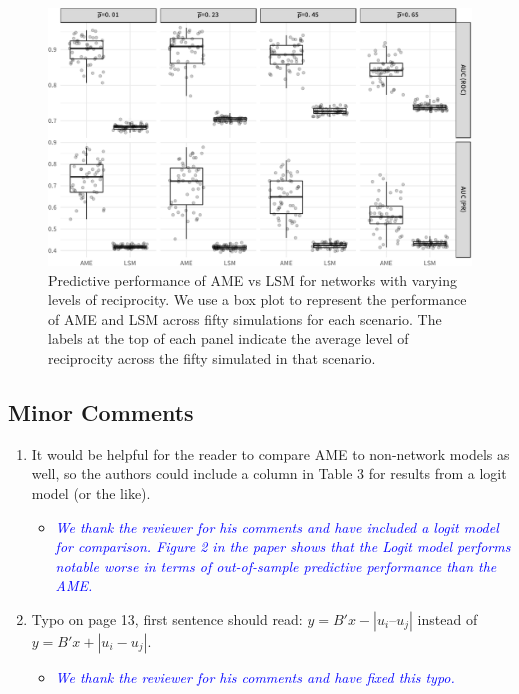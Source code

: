 \begin{enumerate}
\begin{itemize}
\begin{itemize}
{{				}}
			\end{itemize}	
			\begin{figure}[ht]
				\centering
				\includegraphics[width=1\textwidth]{sim2Viz.pdf}
				\caption{Predictive performance of AME vs LSM for networks with varying levels of reciprocity. We use a box plot to represent the performance of AME and LSM across fifty simulations for each scenario. The labels at the top of each panel indicate the average level of reciprocity across the fifty simulated in that scenario.}
				\label{fig:sim_recip}		
			\end{figure}
	\end{itemize}
\end{enumerate}

\subsection{Minor Comments}

\begin{enumerate}
	\item It would be helpful for the reader to compare AME to non-network models as well, so the authors could include a column in Table 3 for results from a logit model (or the like). 
	\begin{itemize}
		\item \textcolor{blue}{ \emph{
		We thank the reviewer for his comments and have included a logit model for comparison. Figure 2 in the paper shows that the Logit model performs notable worse in terms of out-of-sample predictive performance than the AME.
		}}
	\end{itemize}		
	\item Typo on page 13, first sentence should read: $y = B'x - |u_i – u_j|$ instead of $y = B'x + |u_i - u_j|$.
	\begin{itemize}
		\item \textcolor{blue}{ \emph{
		We thank the reviewer for his comments and have fixed this typo.
		}}
	\end{itemize}		
\end{enumerate}

